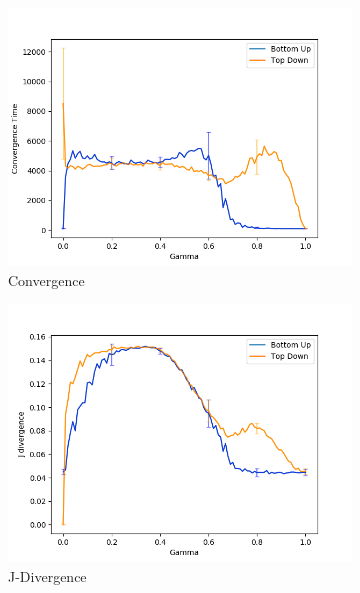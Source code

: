 \begin{figure}
 \centering
  \begin{subfigure}[ht]{0.45\textwidth}
    \includegraphics[width=\textwidth]{Images/Figures/BU+TD/FIE/Convergence_better.png}
    \caption{Convergence}
 \end{subfigure}
 \hfill
 \begin{subfigure}[ht]{0.45\textwidth}
    \includegraphics[width=\textwidth]{Images/Figures/BU+TD/FIE/J-Div_better.png}
    \caption{J-Divergence}
 \end{subfigure}
 \hfill
 \begin{subfigure}[ht]{0.45\textwidth}

\end{subfigure}
\end{figure}
